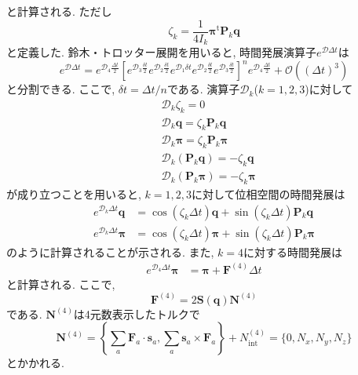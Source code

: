 と計算される. ただし
\begin{equation}
 \zeta_{k} = \frac{1}{4I_{k}}
  \bm{\pi}^{\mathrm{t}} \bm{P}_{k} \bm{q}
\end{equation}
と定義した. 
鈴木・トロッター展開を用いると, 時間発展演算子$e^{\mathcal{D} \Delta t}$は
\begin{equation}
 e^{\mathcal{D} \Delta t}
  =
  e^{\mathcal{D}_{4} \frac{\Delta t}{2}}
  \left[
   e^{\mathcal{D}_{3} \frac{\delta t}{2}}
   e^{\mathcal{D}_{2} \frac{\delta t}{2}}
   e^{\mathcal{D}_{1} \delta t}
   e^{\mathcal{D}_{2} \frac{\delta t}{2}}
   e^{\mathcal{D}_{3} \frac{\delta t}{2}}
  \right]^{n}
  e^{\mathcal{D}_{4} \frac{\Delta t}{2}}
  +
  \mathcal{O}\left( (\Delta t)^{3}\right)
\end{equation}
と分割できる. ここで, $\delta t = \Delta t / n$である. 
演算子$\mathcal{D}_{k}$($k=1,2,3$)に対して
\begin{align}
 &\mathcal{D}_{k} \zeta_{k} = 0
 \\
 &\mathcal{D}_{k} \bm{q} = \zeta_{k} \bm{P}_{k} \bm{q}
 \\
 &\mathcal{D}_{k} \bm{\pi} = \zeta_{k} \bm{P}_{k} \bm{\pi}
 \\
 &\mathcal{D}_{k} (\bm{P}_{k} \bm{q}) = - \zeta_{k} \bm{q}
 \\
 &\mathcal{D}_{k} (\bm{P}_{k} \bm{\pi}) = - \zeta_{k} \bm{\pi}
\end{align}
が成り立つことを用いると, $k=1,2,3$に対して位相空間の時間発展は
\begin{align}
 e^{\mathcal{D}_{k} \Delta t} \bm{q}
 &=
 \cos(\zeta_{k} \Delta t) \bm{q} + \sin(\zeta_{k} \Delta t) \bm{P}_{k} \bm{q}
 \\
 e^{\mathcal{D}_{k} \Delta t} \bm{\pi}
 &=
 \cos(\zeta_{k} \Delta t) \bm{\pi} + \sin(\zeta_{k} \Delta t) \bm{P}_{k} \bm{\pi}
\end{align}
のように計算されることが示される. また, $k=4$に対する時間発展は
\begin{align}
 e^{\mathcal{D}_{4} \Delta t} \bm{\pi}
 &=
 \bm{\pi} + \bm{F}^{(4)} \Delta t 
\end{align}
と計算される. ここで, 
\begin{equation}
 \bm{F}^{(4)} = 2 \bm{S}(\bm{q}) \bm{N}^{(4)}
\end{equation}
である. $\bm{N}^{(4)}$は4元数表示したトルクで
\begin{equation}
 \bm{N}^{(4)}
  = \left\{\sum_{a} \bm{F}_{a} \cdot \bm{s}_{a},
           \sum_{a} \bm{s}_{a} \times \bm{F}_{a} \right\}
  + N_{\mathrm{int}}^{(4)}
  = \{0, N_{x}, N_{y}, N_{z} \}
\end{equation}
とかかれる. 
\clearpage


